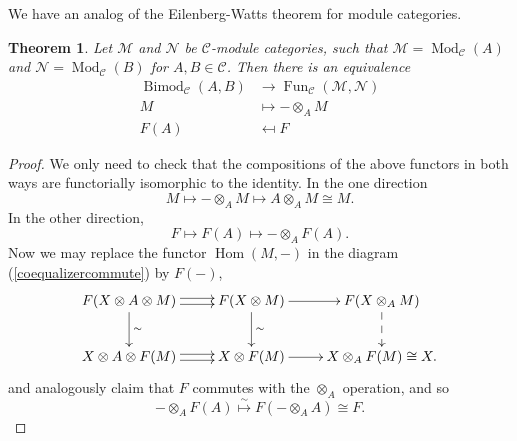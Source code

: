\documentclass[a4paper, 10pt]{book}
\newtheorem{theorem}{Theorem}[chapter]
\theoremstyle{definition}
\numberwithin{equation}{chapter}
\newcommand\ot{\otimes}
\newcommand\Bimod{\operatorname{Bimod}}
\newcommand\Fun{\operatorname{Fun}}
\newcommand\Hom{\operatorname{Hom}}
\newcommand\Mod{\operatorname{Mod}}
\newcommand\M{\mathcal{M}}
\newcommand\NN{\mathcal{N}}
\newcommand\C{\mathcal C}
\begin{document}
We have an analog of the Eilenberg-Watts theorem for module categories.
\begin{theorem}\label{eilenberg-watts}
Let $\M$ and $\NN$ be $\C$-module categories, such that $\M=\Mod_\C(A)$ and $\NN=\Mod_\C(B)$ for $A, B\in \C$. Then there is an equivalence \begin{align}
	\Bimod_\C(A, B) &\rightarrow \Fun_\C(\M, \NN)\\
	M &\mapsto -\otimes_A M \\
	F(A) &\mapsfrom F
\end{align}
\end{theorem}
\begin{proof}
We only need to check that the compositions of the above functors in both ways are functorially isomorphic to the identity. In the one direction \begin{equation}
	M\mapsto -\otimes_A M \mapsto A\otimes_A M \cong  M.
\end{equation} In the other direction, \begin{equation}
	F\mapsto F(A) \mapsto -\otimes_A F(A).
\end{equation} Now we may replace the functor $\Hom(M, -)$ in the diagram (\ref{coequalizercommute}) by $F(-)$, 
\begin{equation}
	\xymatrix{F(X\otimes A \otimes M) \ar@<-.5ex>[r] \ar@<.5ex>[r]\ar[d]^{\sim} & F(X\otimes M) \ar[r]\ar[d]^{\sim} & F(X\otimes_A M)\ar@{-->}[d] \\
	X\otimes A \otimes F(M) \ar@<-.5ex>[r] \ar@<.5ex>[r] & X\otimes F(M) \ar[r] & X\otimes_A F(M)\cong X.}
\end{equation} and analogously claim that $F$ commutes with the $\ot_A$ operation, and so\begin{equation}
	-\otimes_A F(A) \overset{\sim}\longmapsto F(-\otimes_A A) \cong F.
\end{equation}
\end{proof}
\end{document}
